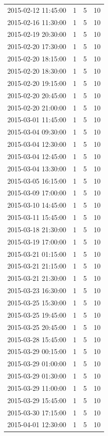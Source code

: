 \begin{tabular}{lrrr}
2015-02-12 11:45:00 & 1 & 5 & 10 \\
2015-02-16 11:30:00 & 1 & 5 & 10 \\
2015-02-19 20:30:00 & 1 & 5 & 10 \\
2015-02-20 17:30:00 & 1 & 5 & 10 \\
2015-02-20 18:15:00 & 1 & 5 & 10 \\
2015-02-20 18:30:00 & 1 & 5 & 10 \\
2015-02-20 19:15:00 & 1 & 5 & 10 \\
2015-02-20 20:45:00 & 1 & 5 & 10 \\
2015-02-20 21:00:00 & 1 & 5 & 10 \\
2015-03-01 11:45:00 & 1 & 5 & 10 \\
2015-03-04 09:30:00 & 1 & 5 & 10 \\
2015-03-04 12:30:00 & 1 & 5 & 10 \\
2015-03-04 12:45:00 & 1 & 5 & 10 \\
2015-03-04 13:30:00 & 1 & 5 & 10 \\
2015-03-05 16:15:00 & 1 & 5 & 10 \\
2015-03-09 17:00:00 & 1 & 5 & 10 \\
2015-03-10 14:45:00 & 1 & 5 & 10 \\
2015-03-11 15:45:00 & 1 & 5 & 10 \\
2015-03-18 21:30:00 & 1 & 5 & 10 \\
2015-03-19 17:00:00 & 1 & 5 & 10 \\
2015-03-21 01:15:00 & 1 & 5 & 10 \\
2015-03-21 21:15:00 & 1 & 5 & 10 \\
2015-03-21 21:30:00 & 1 & 5 & 10 \\
2015-03-23 16:30:00 & 1 & 5 & 10 \\
2015-03-25 15:30:00 & 1 & 5 & 10 \\
2015-03-25 19:45:00 & 1 & 5 & 10 \\
2015-03-25 20:45:00 & 1 & 5 & 10 \\
2015-03-28 15:45:00 & 1 & 5 & 10 \\
2015-03-29 00:15:00 & 1 & 5 & 10 \\
2015-03-29 01:00:00 & 1 & 5 & 10 \\
2015-03-29 01:30:00 & 1 & 5 & 10 \\
2015-03-29 11:00:00 & 1 & 5 & 10 \\
2015-03-29 15:45:00 & 1 & 5 & 10 \\
2015-03-30 17:15:00 & 1 & 5 & 10 \\
2015-04-01 12:30:00 & 1 & 5 & 10 \\

\end{tabular}
